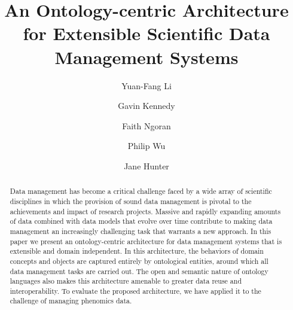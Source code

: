 \documentclass[preprint,12pt]{elsarticle}
\begin{document}
\begin{frontmatter}



\title{An Ontology-centric Architecture for Extensible Scientific Data Management Systems}



\author[monash]{Yuan-Fang Li}

\author[uq,csiro]{Gavin Kennedy}

\author[uq]{Faith Ngoran}

\author[anu]{Philip Wu}

\author[uq]{Jane Hunter}

\address[monash]{Clayton School of IT, Monash University}
\address[uq]{School of ITEE, The University of Queensland}
\address[csiro]{High Resolution Plant Phenomics Centre, Canberra}
\address[anu]{The John Curtin School of Medical Research, Australian National University}

\begin{abstract}
Data management has become a critical challenge faced by a wide array of scientific disciplines in which the provision of sound data management is pivotal to the achievements and impact of research projects. Massive and rapidly expanding amounts of data combined with data models that evolve over time contribute to making data management an increasingly challenging task that warrants a new approach. In this paper we present an ontology-centric architecture for data management systems that is extensible and domain independent. In this architecture, the behaviors of domain concepts and objects are captured entirely by ontological entities, around which all data management tasks are carried out. The open and semantic nature of ontology languages also makes this architecture amenable to greater data reuse and interoperability. To evaluate the proposed architecture, we have applied it to the challenge of managing phenomics data.
\end{abstract}


\end{frontmatter}
\end{document}
